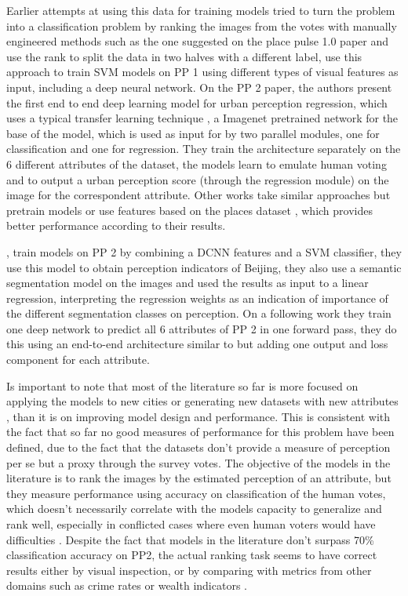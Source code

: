 Earlier attempts at using this data for training models tried to turn the problem into a classification problem
by  ranking the images from the votes with manually engineered methods such as the one suggested on the
place pulse 1.0 paper \cite{hidalgo_inequality} and use the rank to split the data in two halves with a different
label,  use this approach to train SVM models on PP 1 using different types of visual features as input,
including a deep neural network. On the PP 2 paper, the authors present the first end to end deep learning model for
urban perception regression, which uses a typical transfer learning technique \cite{survey_transfer}, a
Imagenet \cite{imagenet} pretrained  network for the base of the model, which is used as input
for by two parallel modules, one for classification and one for regression. They train the architecture
separately on the 6 different attributes of the dataset, the models learn to emulate human voting and
to output a urban perception score (through the regression module) on the image for the correspondent attribute.
Other works \cite{porzi_predicting, santani} take similar approaches but pretrain models or use features based on
the places dataset \cite{zhou_places}, which provides better performance according to their results.


, train models on PP 2 by combining a DCNN features and a SVM classifier, they use this model to
obtain perception indicators of Beijing, they also use a semantic segmentation model \cite{cordts_cityscapes} on the images and used the results
as input to a linear regression, interpreting the regression weights as an indication of importance of the different segmentation
classes on perception. On a following work \cite{zhang_uncovering} they train one deep network to predict all 6 attributes of PP 2
in one forward pass, they do this using an end-to-end architecture similar to  but adding
one output and loss component for each attribute.

Is important to note that most of the literature so far is more focused on applying the models to new cities
\cite{zhang_measuring, santani, costa_lisbon, rossetti} or generating new datasets with new attributes
\cite{santani, zhang_uncovering}, than it is on improving model  design and performance.
This is consistent with the fact that so far no good measures of performance for this problem have been defined,
due to the fact that the datasets don't provide a measure of perception per se but a proxy through the survey votes.
The objective of the models in the literature is to rank the images by the estimated perception of an attribute, but
they measure  performance using accuracy on classification of the human votes, which doesn't necessarily correlate with the
models capacity to generalize and rank well, especially in conflicted cases where even human voters
would have difficulties \cite{zhang_measuring}. Despite the fact that models in the literature don't surpass 70\%
classification  accuracy on  PP2, the actual ranking task seems to have correct results either by visual inspection,
or by comparing with metrics from other domains such as crime rates or wealth indicators \cite{rossetti,zhang_measuring,tamara_judgments}.


